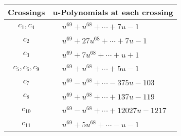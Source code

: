 \documentclass[1p]{elsarticle_modified}
\theoremstyle{definition}
\begin{document}
\begin{tabular}{m{50pt}|m{274pt}}
Crossings & \hspace{64pt}u-Polynomials at each crossing \\
\hline $$\begin{aligned}c_{1},c_{4}\end{aligned}$$&$\begin{aligned}
&u^{69}+u^{68}+\cdots+7 u-1
\end{aligned}$\\
\hline $$\begin{aligned}c_{2}\end{aligned}$$&$\begin{aligned}
&u^{69}+27 u^{68}+\cdots+7 u-1
\end{aligned}$\\
\hline $$\begin{aligned}c_{3}\end{aligned}$$&$\begin{aligned}
&u^{69}+7 u^{68}+\cdots+u+1
\end{aligned}$\\
\hline $$\begin{aligned}c_{5},c_{6},c_{9}\end{aligned}$$&$\begin{aligned}
&u^{69}+u^{68}+\cdots+5 u-1
\end{aligned}$\\
\hline $$\begin{aligned}c_{7}\end{aligned}$$&$\begin{aligned}
&u^{69}- u^{68}+\cdots-375 u-103
\end{aligned}$\\
\hline $$\begin{aligned}c_{8}\end{aligned}$$&$\begin{aligned}
&u^{69}+u^{68}+\cdots+137 u-119
\end{aligned}$\\
\hline $$\begin{aligned}c_{10}\end{aligned}$$&$\begin{aligned}
&u^{69}- u^{68}+\cdots+12027 u-1217
\end{aligned}$\\
\hline $$\begin{aligned}c_{11}\end{aligned}$$&$\begin{aligned}
&u^{69}+5 u^{68}+\cdots- u-1
\end{aligned}$\\
\hline
\end{tabular}\\~\\
\end{document}
